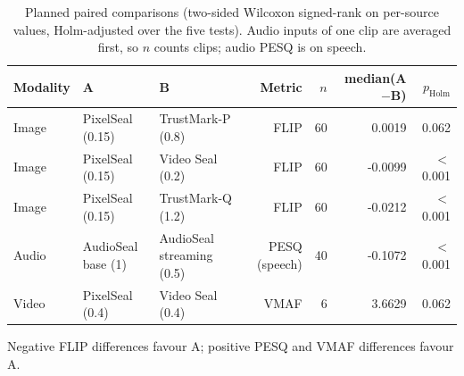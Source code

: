 \begin{table}[!t]
\centering
\footnotesize
\caption{Planned paired comparisons (two-sided Wilcoxon signed-rank on per-source values, Holm-adjusted over the five tests). Audio inputs of one clip are averaged first, so $n$ counts clips; audio PESQ is on speech.}
\label{tab:tests}
\setlength{\tabcolsep}{3.4pt}
\begin{tabular}{lllrrrr}
\toprule
Modality & A & B & Metric & $n$ & median(A$-$B) & $p_{\mathrm{Holm}}$ \\
\midrule
Image & PixelSeal (0.15) & TrustMark-P (0.8) & FLIP & 60 & 0.0019 & 0.062 \\
Image & PixelSeal (0.15) & Video Seal (0.2) & FLIP & 60 & -0.0099 & $<$0.001 \\
Image & PixelSeal (0.15) & TrustMark-Q (1.2) & FLIP & 60 & -0.0212 & $<$0.001 \\
Audio & AudioSeal base (1) & AudioSeal streaming (0.5) & PESQ (speech) & 40 & -0.1072 & $<$0.001 \\
Video & PixelSeal (0.4) & Video Seal (0.4) & VMAF & 6 & 3.6629 & 0.062 \\
\bottomrule
\end{tabular}
\par\vspace{2pt}\parbox{\linewidth}{\raggedright\scriptsize Negative FLIP differences favour A; positive PESQ and VMAF differences favour A.}
\end{table}
